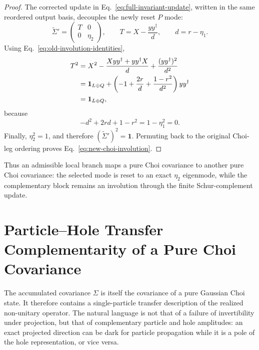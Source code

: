 \documentclass[aps,prb,onecolumn,nofootinbib,superscriptaddress]{revtex4-2}
\newcommand{\I}{\mathbf{1}}
\theoremstyle{plain}
\theoremstyle{definition}
\begin{document}
\begin{proof}
  The corrected update in Eq.~\eqref{eq:full-invariant-update}, written in
  the same reordered output basis, decouples the newly reset \(P\) mode:
  \begin{equation}
    \widetilde{\Sigma}'
    =
    \begin{pmatrix}
      T & 0\\
      0 & \eta_2
    \end{pmatrix},
    \qquad
    T=X-\frac{yy^\dagger}{d},
    \qquad
    d=r-\eta_1.
    \label{eq:updated-involution-decomposition}
  \end{equation}
  Using Eq.~\eqref{eq:old-involution-identities},
  \begin{align}
    T^2
    &=
    X^2-\frac{Xyy^\dagger+yy^\dagger X}{d}
    +\frac{(yy^\dagger)^2}{d^2}
    \notag\\
    &=
    \I_{L\oplus Q}
    +
    \left(
      -1+\frac{2r}{d}+\frac{1-r^2}{d^2}
    \right)yy^\dagger
    \notag\\
    &=
    \I_{L\oplus Q},
    \label{eq:T-square-identity}
  \end{align}
  because
  \begin{equation}
    -d^2+2rd+1-r^2
    =
    1-\eta_1^2
    =
    0.
  \end{equation}
  Finally, \(\eta_2^2=1\), and therefore
  \(\left(\widetilde{\Sigma}'\right)^2=\I\).  Permuting back to the original
  Choi-leg ordering proves Eq.~\eqref{eq:new-choi-involution}.
\end{proof}

Thus an admissible local branch maps a pure Choi covariance to another pure
Choi covariance: the selected mode is reset to an exact \(\eta_2\)
eigenmode, while the complementary block remains an involution through the
finite Schur-complement update.

\section{Particle--Hole Transfer Complementarity of a Pure Choi Covariance}
\label{sec:bipartite-reconstruction}

The accumulated covariance \(\Sigma\) is itself the covariance of a pure
Gaussian Choi state.  It therefore contains a single-particle transfer
description of the realized non-unitary operator.  The natural language is
not that of a failure of invertibility under projection, but that of
complementary particle and hole amplitudes: an exact projected direction can
be dark for particle propagation while it is a pole of the hole
representation, or vice versa.
\end{document}
